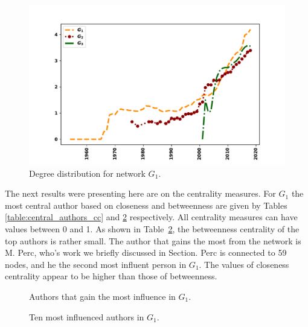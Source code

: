 \documentclass{article}
\theoremstyle{definition}
\begin{document}
\begin{figure}[!hbtp]
    \centering
    \includegraphics[width=.7\textwidth]{./assets/images/degrees_over_time.pdf}
    \caption{Degree distribution for network \(G_1\).}\label{fig:degree_distr_cumu}
\end{figure}

\begin{table}[!hbtp]
    \centering
    \begin{adjustbox}{totalheight=\baselineskip}
    }
    \caption{Collaborativeness metrics for cumulative graphs.}\label{table:coll_cumulative}
\end{adjustbox}
\end{table}

The next results were presenting here are on the centrality measures. For \(G_1\)
the most central author based on closeness and betweenness are given by Tables
\ref{table:central_authors_cc} and \ref{table:central_authors} respectively.
All centrality measures can have values between 0 and 1. As shown in
Table~\ref{table:central_authors}, the betweenness centrality of the top authors
is rather small. The author that gains the most from the network is M. Perc,
who's work we briefly discussed in Section. Perc is connected to 59 nodes, and
he the second most influent person in \(G_1\). The values of closeness centrality
appear to be higher than those of betweenness.

\begin{figure}[!hbtp]
    \begin{minipage}{.45\textwidth}
        \centering
        
        \caption{Authors that gain the most influence in \(G_1\).}\label{table:central_authors_cc}
    \end{minipage}%
    \begin{minipage}{.45\textwidth}
        \centering
        
        \caption{Ten most influenced authors in \(G_1\).}\label{table:central_authors}
    \end{minipage}
\end{figure}
\end{document}
